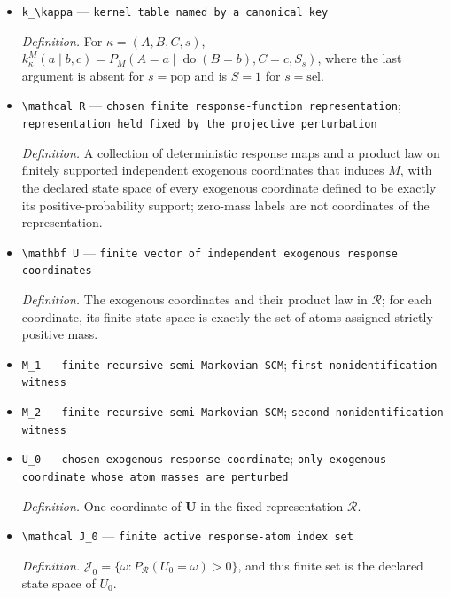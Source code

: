 \documentclass{article}
\begin{document}
\begin{itemize}
  \par\smallskip\noindent\emph{Definition.} \(q_0^M(t)=P_M(T_0=t)\).
  \item \texttt{k\_\allowbreak{}\textbackslash{}\allowbreak{}kappa} --- \texttt{kernel table named by a canonical key}
  \par\smallskip\noindent\emph{Definition.} For \(\kappa=(A,B,C,s)\), \(k_\kappa^M(a\mid b,c)=P_M(A=a\mid\operatorname{do}(B=b),C=c,S_s)\), where the last argument is absent for \(s=\mathrm{pop}\) and is \(S=1\) for \(s=\mathrm{sel}\).
  \item \texttt{\textbackslash{}\allowbreak{}mathcal R} --- \texttt{chosen finite response-\allowbreak{}function representation}; \texttt{representation held fixed by the projective perturbation}
  \par\smallskip\noindent\emph{Definition.} A collection of deterministic response maps and a product law on finitely supported independent exogenous coordinates that induces \(M\), with the declared state space of every exogenous coordinate defined to be exactly its positive-probability support; zero-mass labels are not coordinates of the representation.
  \item \texttt{\textbackslash{}\allowbreak{}mathbf U} --- \texttt{finite vector of independent exogenous response coordinates}
  \par\smallskip\noindent\emph{Definition.} The exogenous coordinates and their product law in \(\mathcal R\); for each coordinate, its finite state space is exactly the set of atoms assigned strictly positive mass.
  \item \texttt{M\_\allowbreak{}1} --- \texttt{finite recursive semi-\allowbreak{}Markovian SCM}; \texttt{first nonidentification witness}
  \item \texttt{M\_\allowbreak{}2} --- \texttt{finite recursive semi-\allowbreak{}Markovian SCM}; \texttt{second nonidentification witness}
  \item \texttt{U\_\allowbreak{}0} --- \texttt{chosen exogenous response coordinate}; \texttt{only exogenous coordinate whose atom masses are perturbed}
  \par\smallskip\noindent\emph{Definition.} One coordinate of \(\mathbf U\) in the fixed representation \(\mathcal R\).
  \item \texttt{\textbackslash{}\allowbreak{}mathcal J\_\allowbreak{}0} --- \texttt{finite active response-\allowbreak{}atom index set}
  \par\smallskip\noindent\emph{Definition.} \(\mathcal J_0=\{\omega:P_{\mathcal R}(U_0=\omega)>0\}\), and this finite set is the declared state space of \(U_0\).

\end{itemize}
\end{document}
